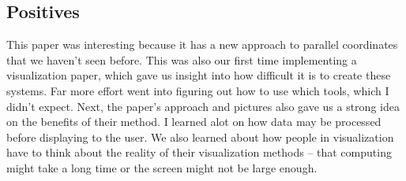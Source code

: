 \documentclass[	DIV=calc,%
			paper=a4,%
			fontsize=11pt,%
			twocolumn]{scrartcl}					%
\begin{document}
\subsection {Positives}
This paper was interesting because it has a new approach to parallel coordinates that we haven't seen before. This was also our first time implementing a visualization paper, 
which gave us insight into how difficult it is to create these systems. Far more effort went into figuring out how to use which tools, which I didn't expect. Next, the paper's approach
and pictures also gave us a strong idea on the benefits of their method. I learned alot on how data may be processed before displaying to the user. We also learned about
how people in visualization have to think about the reality of their visualization methods -- that computing might take a long time or the screen might not be large enough. 
\end{document}
